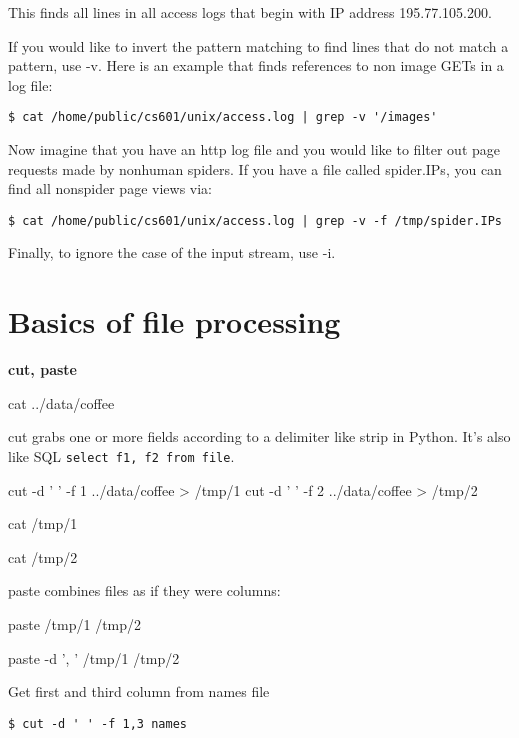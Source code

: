\begin{fullwidth}
\noindent This finds all lines in all access logs that begin with IP address 195.77.105.200.

If you would like to invert the pattern matching to find lines that do not match a pattern, use -v. Here is an example that finds references to non image GETs in a log file:

\begin{lstlisting}[style=BashInputStyle]
$ cat /home/public/cs601/unix/access.log | grep -v '/images'
\end{lstlisting}

Now imagine that you have an http log file and you would like to filter out page requests made by nonhuman spiders. If you have a file called spider.IPs, you can find all nonspider page views via:

\begin{lstlisting}[style=BashInputStyle]
$ cat /home/public/cs601/unix/access.log | grep -v -f /tmp/spider.IPs
\end{lstlisting}

Finally, to ignore the case of the input stream, use -i.

\section{Basics of file processing}

{\bf cut, paste}

{\small
\bash[script,stdout,prefix=$]
cat ../data/coffee
\END
}

cut grabs one or more fields according to a delimiter like strip in Python. It's also like SQL {\tt select f1, f2 from file}.

{\small
\bash[script,stdout,prefix=$]
cut -d ' ' -f 1 ../data/coffee > /tmp/1
cut -d ' ' -f 2 ../data/coffee > /tmp/2
\END
}

{\small
\bash[script,stdout,prefix=$]
cat /tmp/1
\END
}

{\small
\bash[script,stdout,prefix=$]
cat /tmp/2
\END
}

paste combines files as if they were columns:

{\small
\bash[script,stdout,prefix=$]
paste /tmp/1 /tmp/2
\END
}

{\small
\bash[script,stdout,prefix=$]
paste -d ', ' /tmp/1 /tmp/2
\END
}

Get first and third column from names file

\begin{lstlisting}[style=BashInputStyle]
$ cut -d ' ' -f 1,3 names
\end{lstlisting}


\end{fullwidth}
